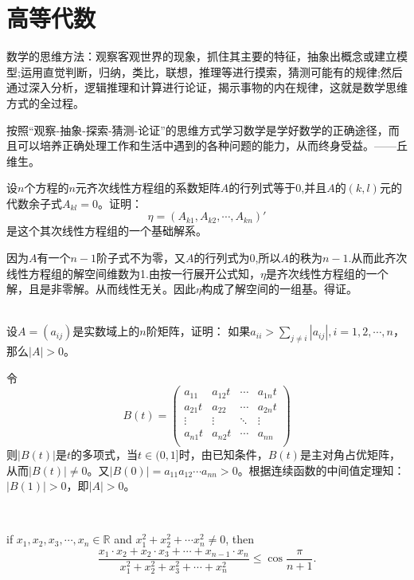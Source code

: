 \chapter{高等代数}
数学的思维方法：观察客观世界的现象，抓住其主要的特征，抽象出概念或建立模型;运用直觉判断，归纳，类比，联想，推理等进行摸索，猜测可能有的规律;然后通过深入分析，逻辑推理和计算进行论证，揭示事物的内在规律，这就是数学思维方式的全过程。

按照“观察-抽象-探索-猜测-论证”的思维方式学习数学是学好数学的正确途径，而且可以培养正确处理工作和生活中遇到的各种问题的能力，从而终身受益。——丘维生。


\begin{exercise}
\hfill
设$n$个方程的$n$元齐次线性方程组的系数矩阵$A$的行列式等于0,并且$A$的$(k,l)$元的代数余子式$A_{kl}=0$。证明：$$\eta=(A_{k1},A_{k2},\cdots,A_{kn})'$$是这个其次线性方程组的一个基础解系。


因为$A$有一个$n-1$阶子式不为零，又$A$的行列式为0,所以$A$的秩为$n-1$.从而此齐次线性方程组的解空间维数为1.由按一行展开公式知，$\eta$是齐次线性方程组的一个解，且是非零解。从而线性无关。因此$\eta$构成了解空间的一组基。得证。
\end{exercise}
\begin{exercise}
\hfill\\
设$A=(a_{ij})$是实数域上的$n$阶矩阵，证明：
如果$a_{ii}>\sum_{j\not=i}|a_{ij}|,i=1,2,\cdots,n$，那么$|A|>0$。

令
$$
B(t)=
\left(
\begin{array}{llll}
a_{11}&a_{12}t&\cdots&a_{1n}t\\
a_{21}t&a_{22}&\cdots&a_{2n}t\\
\vdots&\vdots&\ddots&\vdots\\
a_{n1}t&a_{n2}t&\cdots&a_{nn}\\
\end{array}
\right)
$$
则$|B(t)|$是$t$的多项式，当$t\in(0,1]$时，由已知条件，$B(t)$是主对角占优矩阵，从而$|B(t)|\neq0$。又$|B(0)|=a_{11}a_{12}\cdots a_{nn}>0$。根据连续函数的中间值定理知：$|B(1)|>0$，即$|A|>0$。
\end{exercise}
\hfill\\

\begin{exercise}
    if $x_1, x_2, x_3,\cdots, x_n\in\mathbb R$ and $x_1^2+x_2^2+\cdots x_n^2\neq0$, then 
    \begin{equation*}
        \frac{x_1\cdot x_2 + x_2\cdot x_3 + \cdots + x_{n-1}\cdot x_n}{x_1^2 + x_2^2 + x_3^2 + \cdots + x_n^2} \leq \cos\frac{\pi}{n+1}.
    \end{equation*}
\end{exercise}


